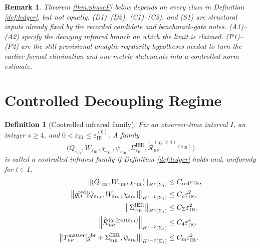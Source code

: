 \documentclass[11pt]{article}
\newcommand{\ObserverMetric}{g^{\mathrm{br}}}
\newcommand{\BaseShift}{\Sigma^{\mathrm{IER}}}
\newcommand{\SourceDensityRed}{\varrho_\Omega^{\mathrm{red}}}
\newcommand{\RemLongFour}{\widetilde{\mathcal R}_{\mu\nu}^{(\chi,\ge 4)}}
\newcommand{\IRsmall}{\varepsilon_{\mathrm{IR}}}
\newtheorem{definition}{Definition}
\newtheorem{remark}{Remark}
\begin{document}
\begin{remark}
Theorem \ref{thm:phaseF} below depends on every class in Definition \ref{def:ledger}, but not equally. (D1)--(D2), (C1)--(C3), and (S1) are structural inputs already fixed by the recorded candidate and benchmark-gate notes. (A1)--(A2) specify the decaying infrared branch on which the limit is claimed. (P1)--(P2) are the still-provisional analytic regularity hypotheses needed to turn the earlier formal elimination and one-metric statements into a controlled norm estimate.
\end{remark}

\section{Controlled Decoupling Regime}

\begin{definition}[Controlled infrared family]
\label{def:family}
Fix an observer-time interval \(I\), an integer \(s\ge4\), and \(0<\IRsmall\le \IRsmall^{(0)}\). A family
\[
\bigl(
Q_{\IRsmall},W_{\IRsmall},\chi_{\IRsmall},
\psi_{\IRsmall},
\BaseShift_{\IRsmall},
\RemLongFour{}^{(\IRsmall)}
\bigr)
\]
is called a \emph{controlled infrared family} if Definition \ref{def:ledger} holds and, uniformly for \(t\in I\),
\begin{align}
\norm{(Q_{\IRsmall},W_{\IRsmall},\chi_{\IRsmall})}_{H^s(\Sigma_t)}
&\le C_{\mathrm{red}}\IRsmall,
\label{eq:fam1}
\\
\norm{\SourceDensityRed[Q_{\IRsmall},W_{\IRsmall},\chi_{\IRsmall}]}_{H^{s-1}(\Sigma_t)}
&\le C_\rho \IRsmall^2,
\label{eq:fam2}
\\
\norm{\BaseShift_{\IRsmall}}_{H^s(\Sigma_t)}
&\le C_{\Sigma}\IRsmall^2,
\label{eq:fam3}
\\
\norm{\RemLongFour{}^{(\IRsmall)}}_{H^{s-2}(\Sigma_t)}
&\le C_{4}\IRsmall^4,
\label{eq:fam4}
\\
\norm{T_{\mu\nu}^{\mathrm{matter}}[\ObserverMetric+\BaseShift_{\IRsmall},\psi_{\IRsmall}]}_{H^{s-2}(\Sigma_t)}
&\le C_{\mathrm{m}}\IRsmall^2.
\label{eq:fam5}
\end{align}
\end{definition}
\end{document}
